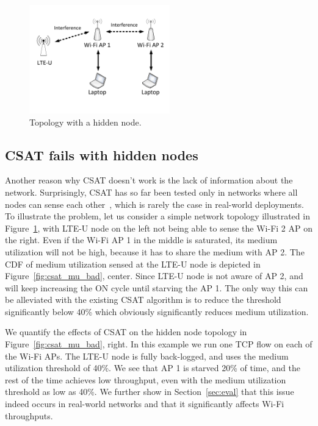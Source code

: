 


\begin{figure}[htb!]
\vspace{-12pt}
 \centering
    \includegraphics[width=2.4in]{./figures/topology.pdf}
\vspace{-24pt}
 \caption{Topology with a hidden node.}
  \label{fig:csat_hidden}
\vspace{-12pt}
\end{figure}



\subsection{CSAT fails with hidden nodes}

Another reason why CSAT doesn't work is the lack of information about the network. 
Surprisingly, CSAT has so far been tested only in networks where all nodes can sense each other~\cite{qualcommpresentation, google, cablelabs}, which is rarely the case in real-world deployments. 
To illustrate the problem, let us consider a simple network topology illustrated in Figure~\ref{fig:csat_hidden}, with LTE-U node on the left not being able to sense the Wi-Fi 2 AP on the right. 
Even if the Wi-Fi AP 1 in the middle is saturated, its medium utilization will not be high, because it has to share the medium with AP 2. 
The CDF of medium utilization sensed at the LTE-U node is depicted in Figure~\ref{fig:csat_mu_bad}, center. 
Since LTE-U node is not aware of AP 2, and will keep increasing the ON cycle until starving the AP 1. 
The only way this can be alleviated with the existing CSAT algorithm is to reduce the threshold significantly below 40\% which obviously significantly reduces medium utilization.
 
We quantify the effects of CSAT on the hidden node topology in Figure~\ref{fig:csat_mu_bad}, right. In this example we run one TCP flow on each of the Wi-Fi APs. The LTE-U node is fully back-logged, and uses the medium utilization threshold of 40\%. We see that AP 1 is starved 20\% of time, and the rest of the time achieves low throughput, even with the medium utilization threshold as low as 40\%. We further show in Section~\ref{sec:eval} that this issue indeed occurs in real-world networks and that it significantly affects Wi-Fi throughputs. 






